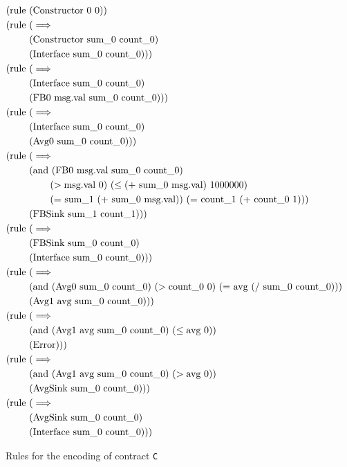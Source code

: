 \begin{figure}[ht]
	\centering
	\begin{align*}
	(\text{rule } & (\text{Constructor 0 0}))
    \\
    (\text{rule } & (\implies \\
    & (\text{Constructor sum\_0 count\_0}) \\ 
    & (\text{Interface sum\_0 count\_0})))
    \\
    (\text{rule } & (\implies \\
    & (\text{Interface sum\_0 count\_0}) \\ 
    & (\text{FB0 msg.val sum\_0 count\_0})))
    \\
    (\text{rule } & (\implies \\
    & (\text{Interface sum\_0 count\_0}) \\ 
    & (\text{Avg0 sum\_0 count\_0})))
    \\
	(\text{rule } & (\implies \\
    & (\text{and } (\text{FB0 msg.val sum\_0 count\_0}) \\
    & \hspace{0.76cm} (>\text{msg.val 0}) \ (\leq\text{(+ sum\_0 msg.val) 1000000}) \\
    & \hspace{0.76cm} (\text{= sum\_1 (+ sum\_0 msg.val)}) \ (\text{= count\_1 (+ count\_0 1}))) \\ 
    & (\text{FBSink sum\_1 count\_1})))
    \\
    (\text{rule } & (\implies \\
    & (\text{FBSink sum\_0 count\_0}) \\ 
    & (\text{Interface sum\_0 count\_0})))
    \\
    (\text{rule } & (\implies \\
    & (\text{and } (\text{Avg0 sum\_0 count\_0}) \ (>\text{count\_0 0}) \ (\text{= avg (/ sum\_0 count\_0)})) \\ 
    & (\text{Avg1 avg sum\_0 count\_0})))
    \\
    (\text{rule } & (\implies \\
    & (\text{and } (\text{Avg1 avg sum\_0 count\_0}) \ (\leq\text{avg 0})) \\ 
    & (\text{Error})))
    \\
    (\text{rule } & (\implies \\
    & (\text{and } (\text{Avg1 avg sum\_0 count\_0}) \ (>\text{avg 0})) \\ 
    & (\text{AvgSink sum\_0 count\_0})))
    \\
    (\text{rule } & (\implies \\
    & (\text{AvgSink sum\_0 count\_0}) \\ 
    & (\text{Interface sum\_0 count\_0})))
    \end{align*}
	\caption{Rules for the encoding of contract \texttt{C}}
	\label{fig:chc_rules}
\end{figure}



